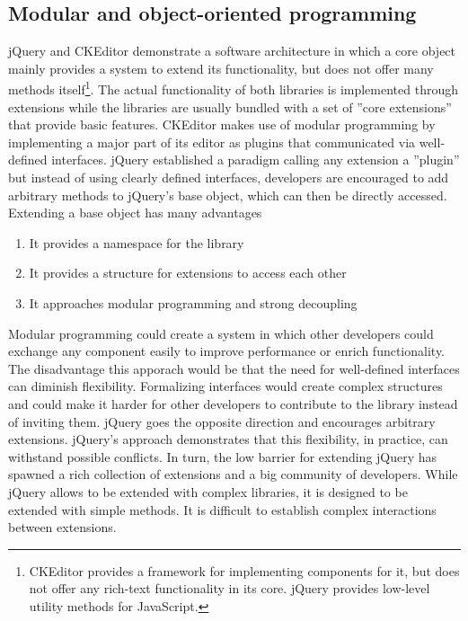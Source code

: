 

\subsection{Modular and object-oriented programming}

jQuery and CKEditor demonstrate a software architecture in which a core object mainly provides a system to extend its functionality, but does not offer many methods itself\footnote{CKEditor provides a framework for implementing components for it, but does not offer any rich-text functionality in its core. jQuery provides low-level utility methods for JavaScript.}. The actual functionality of both libraries is implemented through extensions while the libraries are usually bundled with a set of ''core extensions'' that provide basic features. CKEditor makes use of modular programming by implementing a major part of its editor as plugins that communicated via well-defined interfaces. jQuery established a paradigm calling any extension a ''plugin'' but instead of using clearly defined interfaces, developers are encouraged to add arbitrary methods to jQuery's base object, which can then be directly accessed. Extending a base object has many advantages

\begin{enumerate}
\item It provides a namespace for the library
\item It provides a structure for extensions to access each other
\item It approaches modular programming and strong decoupling
\end{enumerate}

Modular programming could create a system in which other developers could exchange any component easily to improve performance or enrich functionality. The disadvantage this apporach would be that the need for well-defined interfaces can diminish flexibility. Formalizing interfaces would create complex structures and could make it harder for other developers to contribute to the library instead of inviting them. jQuery goes the opposite direction and encourages arbitrary extensions. jQuery's approach demonstrates that this flexibility, in practice, can withstand possible conflicts. In turn, the low barrier for extending jQuery has spawned a rich collection of extensions and a big community of developers. While jQuery allows to be extended with complex libraries, it is designed to be extended with simple methods. It is difficult to establish complex interactions between extensions.

